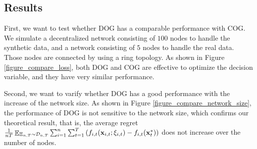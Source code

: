\documentclass{article}
\begin{document}
\subsection{Results}

First, we want to test whether DOG has a comparable performance with COG. We simulate a decentralized network consisting of $100$ nodes to handle the synthetic data, and a network consisting of $5$ nodes to handle the real data. Those nodes are connected by using a ring topology.  As shown in Figure \ref{figure_compare_loss}, both DOG and COG are effective to optimize the decision variable, and they have very similar performance. 



Second, we want to varify whether DOG has a good performance with the increase of the network size. As shown in Figure \ref{figure_compare_network_size}, the performance of DOG is not sensitive to the network size, which confirms our theoretical result, that is, the average regret $\frac{1}{nT}\mathop{\mathbb{E}}_{\Xi_{n,T}\sim \mathcal{D}_{n,T}}\sum_{i=1}^n\sum_{t=1}^T \left(  f_{i,t}({\bf x}_{i,t};\xi_{i,t}) - f_{i,t}({\bf x}_t^{\ast})  \right)$ does not increase over the number of nodes. 
\end{document}
